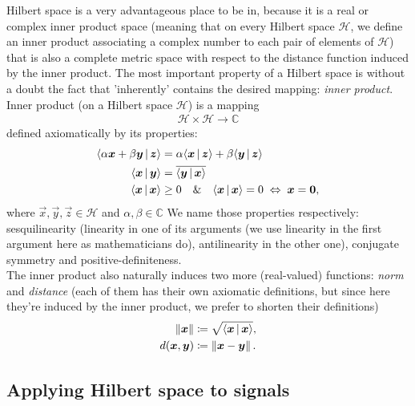 \documentclass[11pt,a4paper]{report}
\theoremstyle{remark}
\theoremstyle{definition}
\begin{document}
				Hilbert space is a very advantageous place to be in, because it is a real or complex inner product space (meaning that on every Hilbert space $\mathcal H$, we define an inner product associating a complex number to each pair of elements of $\mathcal H$) that is also a complete metric space with respect to the distance function induced by the inner product. The most important property of a Hilbert space is without a doubt the fact that 'inherently' contains the desired mapping: \textit{inner product}. \\
				Inner product (on a Hilbert space $\mathcal H$) is a mapping
				\begin{align}
					\mathcal H \times \mathcal H \to \mathbb C
				\end{align}
				defined axiomatically by its properties:
				\begin{subequations}
					\begin{align}
						\langle\alpha \boldsymbol x + \beta \boldsymbol y\,|\,\boldsymbol z\rangle &= \alpha \langle\boldsymbol x\,|\,\boldsymbol z\rangle + \beta \langle\boldsymbol y\,|\,\boldsymbol z\rangle
					\\
						\langle\boldsymbol x\,|\,\boldsymbol y\rangle &= \overline{\langle\boldsymbol y\,|\,\boldsymbol x\rangle}
					\\
						\langle\boldsymbol x\,|\,\boldsymbol x\rangle &\geq 0 \quad \& \quad \langle\boldsymbol x\,|\,\boldsymbol x\rangle = 0 \; \Leftrightarrow \; \boldsymbol x = \boldsymbol 0,
					\end{align}
				\end{subequations}
				where $\vec x, \vec y, \vec z \in \mathcal H$ and $\alpha, \beta \in \mathbb C$ We name those properties respectively: sesquilinearity (linearity in one of its arguments (we use linearity in the first argument here as mathematicians do), antilinearity in the other one), conjugate symmetry and positive-definiteness. \\
				The inner product also naturally induces two more (real-valued) functions: \textit{norm} and \textit{distance} (each of them has their own axiomatic definitions, but since here they're induced by the inner product, we prefer to shorten their definitions)
				\begin{align}
					\left\lVert\boldsymbol x\right\rVert &\coloneqq \sqrt{\langle\boldsymbol x\,|\,\boldsymbol x\rangle},
				\\
					d(\boldsymbol x, \boldsymbol y) &\coloneqq \left\lVert\boldsymbol x - \boldsymbol y\right\rVert.
				\end{align}
				
			\subsection{Applying Hilbert space to signals}
				
\end{document}

